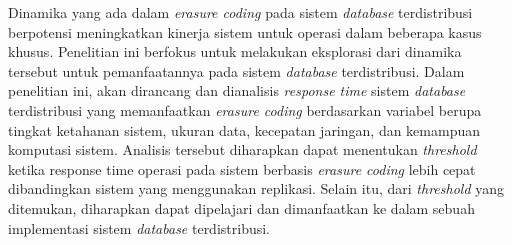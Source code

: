 Dinamika yang ada dalam \textit{erasure coding} pada sistem \textit{database} terdistribusi berpotensi meningkatkan kinerja sistem untuk operasi dalam beberapa kasus khusus. Penelitian ini berfokus untuk melakukan eksplorasi dari dinamika tersebut untuk pemanfaatannya pada sistem \textit{database} terdistribusi. Dalam penelitian ini, akan dirancang dan dianalisis \textit{response time} sistem \textit{database} terdistribusi yang memanfaatkan \textit{erasure coding} berdasarkan variabel berupa tingkat ketahanan sistem, ukuran data, kecepatan jaringan, dan kemampuan komputasi sistem. Analisis tersebut diharapkan dapat menentukan \textit{threshold} ketika response time operasi pada sistem berbasis \textit{erasure coding} lebih cepat dibandingkan sistem yang menggunakan replikasi. Selain itu, dari \textit{threshold} yang ditemukan, diharapkan dapat dipelajari dan dimanfaatkan ke dalam sebuah implementasi sistem \textit{database} terdistribusi.
